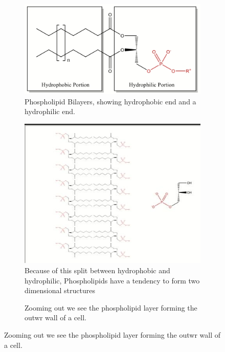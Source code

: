 \documentclass[]{article}
\begin{document}
\begin{figure}[H]
	\caption{Phospholipids}\label{fig:PhosphoLipids}
	\begin{subfigure}[t]{0.3\textwidth}
		\centering
		\caption{Phospholipid Bilayers, showing hydrophobic end and a hydrophilic end.}\label{fig:PhosphoLipid1} 
		\includegraphics[width=\textwidth]{PhosphoLipid1}
	\end{subfigure}\;
	\begin{subfigure}[t]{0.3\textwidth}
		\centering
		\caption{ Because of this split between hydrophobic and hydrophilic, Phospholipids have a tendency to form two dimensional structures}\label{fig:PhosphoLipid2} 
		\includegraphics[width=\textwidth]{PhosphoLipid2}
	\end{subfigure}\;
	\begin{subfigure}[t]{0.3\textwidth}
		\centering
		\caption{Zooming out we see the phospholipid layer forming the outwr wall of a cell.}\label{fig:PhosphoLipid3} 

\end{subfigure}
\end{figure}
\end{document}
